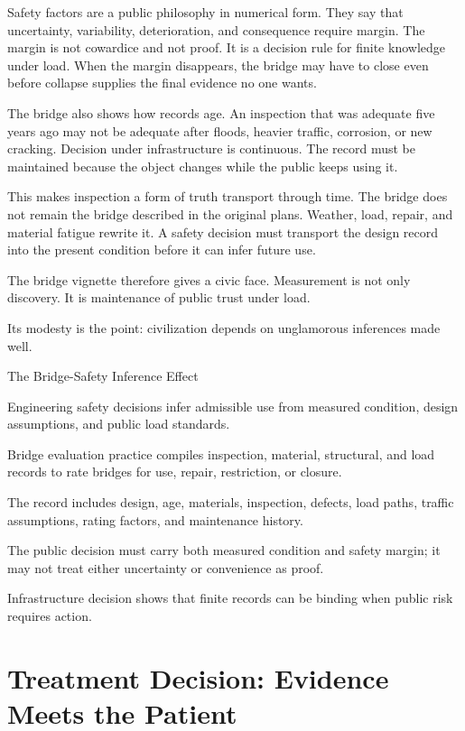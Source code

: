 Safety factors are a public philosophy in numerical form. They say that
uncertainty, variability, deterioration, and consequence require margin. The
margin is not cowardice and not proof. It is a decision rule for finite
knowledge under load. When the margin disappears, the bridge may have to
close even before collapse supplies the final evidence no one wants.

The bridge also shows how records age. An inspection that was adequate five
years ago may not be adequate after floods, heavier traffic, corrosion, or
new cracking. Decision under infrastructure is continuous. The record must be
maintained because the object changes while the public keeps using it.

This makes inspection a form of truth transport through time. The bridge does
not remain the bridge described in the original plans. Weather, load, repair,
and material fatigue rewrite it. A safety decision must transport the design
record into the present condition before it can infer future use.

The bridge vignette therefore gives  a civic face. Measurement
is not only discovery. It is maintenance of public trust under load.

Its modesty is the point: civilization depends on unglamorous inferences made
well.

\begin{phenom}{The Bridge-Safety Inference Effect~\cite{aashto2020}}
\label{ph:bridge-safety-inference}

\PhStatement
Engineering safety decisions infer admissible use from measured condition,
design assumptions, and public load standards.

\PhOrigin
Bridge evaluation practice compiles inspection, material, structural, and load
records to rate bridges for use, repair, restriction, or closure.

\PhObservation
The record includes design, age, materials, inspection, defects, load paths,
traffic assumptions, rating factors, and maintenance history.

\PhConstraint
The public decision must carry both measured condition and safety margin; it
may not treat either uncertainty or convenience as proof.

\PhConsequence
Infrastructure decision shows that finite records can be binding when public
risk requires action.
\end{phenom}

\section{Treatment Decision: Evidence Meets the Patient}

